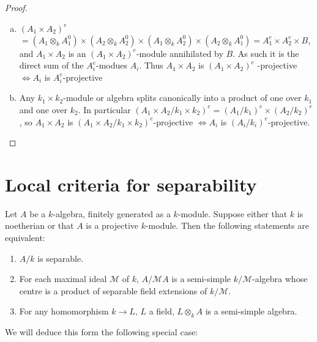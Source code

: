 \begin{proof}%
\begin{enumerate}[(a)]
\item $(A_1 \times A_2)^e$\pageoriginale $ =(A_1 \otimes_k A^0_1) \times (A_2
  \otimes_k A^0_2) \times (A_1 \otimes_k A^0_2) \times (A_2 \otimes_k
  A^0_1) =  A^e_1 \times A^e_2 \times B$, and $A_1 \times A_2$ is an
  $(A_1 \times A_2)^e$-module annihilated by $B$. As such it is the
  direct sum of the $A^e_i$-modues $A_i$. Thus $A_1 \times A_2$ is
  $(A_1 \times A_2)^e$ -projective $\Leftrightarrow A_i$ is
  $A^e_i$-projective  

\item Any $k_1 \times k_2$-module or algebra splits canonically into a
  product of one over $k_1$ and one over $k_2$. In particular $(A_1
  \times A_2 / k_1 \times  k_2)^e =  (A_1 / k_1 )^e \times (A_2 /
  k_2)^e$, so $A_1 \times A_2$ is $(A_1 \times A_2 / k_1 \times
  k_2)^e $-projective $\Leftrightarrow A_i$ is $(A_i /
  k_i)^e$-projective.  
\end{enumerate}
    \end{proof}    
    

\section{Local criteria for separability}\label{chap3:sec3} %
    
  \begin{theorem}\label{chap3:thm3.1}%
Let $A$ be a $k$-algebra, finitely generated as a $k$-module. Suppose
either that $k$ is noetherian or that $A$ is a projective
$k$-module. Then the following statements are equivalent:  
\begin{enumerate} [(1)]
\item $A/k$ is separable.

 \item For each maximal ideal $\mathscr{M}$ of $k$, $A/ \mathscr{M} A$ 
  is a semi-simple $k / \mathscr{M}$-algebra whose centre is a 
  product of separable field extensions of $k / \mathscr{M}$. 

\item For any homomorphism $k \to L$, $L$ a field, $L \otimes_k A$ is
  a semi-simple algebra. 
    \end{enumerate}    
  \end{theorem}

    We will deduce this form the following special case:

